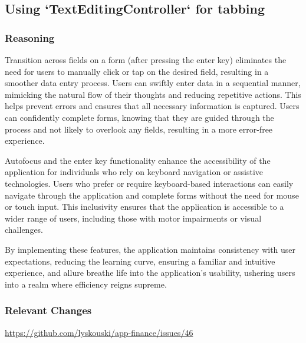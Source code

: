 
\subsection{Using `TextEditingController` for tabbing}

\subsubsection{Reasoning}

Transition across fields on a form (after pressing the enter key) eliminates the need for users to manually 
click or tap on the desired field, resulting in a smoother data entry process. Users can swiftly enter data in a 
sequential manner, mimicking the natural flow of their thoughts and reducing repetitive actions. This helps prevent 
errors and ensures that all necessary information is captured. Users can confidently complete forms, knowing that 
they are guided through the process and not likely to overlook any fields, resulting in a more error-free experience.

Autofocus and the enter key functionality enhance the accessibility of the application for individuals who rely on 
keyboard navigation or assistive technologies. Users who prefer or require keyboard-based interactions can easily 
navigate through the application and complete forms without the need for mouse or touch input. This inclusivity ensures 
that the application is accessible to a wider range of users, including those with motor impairments or visual 
challenges.

By implementing these features, the application maintains consistency with user expectations, reducing the learning 
curve, ensuring a familiar and intuitive experience, and allure breathe life into the application's usability,
ushering users into a realm where efficiency reigns supreme.

\subsubsection{Relevant Changes}

\href{https://github.com/lyskouski/app-finance/issues/46}{https://github.com/lyskouski/app-finance/issues/46}

